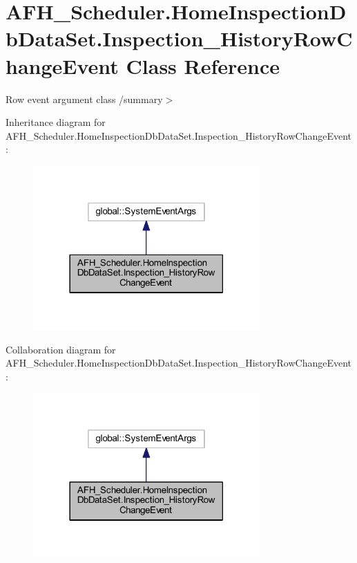 \section{A\+F\+H\+\_\+\+Scheduler.\+Home\+Inspection\+Db\+Data\+Set.\+Inspection\+\_\+\+History\+Row\+Change\+Event Class Reference}
\label{class_a_f_h___scheduler_1_1_home_inspection_db_data_set_1_1_inspection___history_row_change_event}


Row event argument class /summary$>$  




Inheritance diagram for A\+F\+H\+\_\+\+Scheduler.\+Home\+Inspection\+Db\+Data\+Set.\+Inspection\+\_\+\+History\+Row\+Change\+Event\+:
\nopagebreak
\begin{figure}[H]
\begin{center}
\leavevmode
\includegraphics[width=246pt]{class_a_f_h___scheduler_1_1_home_inspection_db_data_set_1_1_inspection___history_row_change_event__inherit__graph}
\end{center}
\end{figure}


Collaboration diagram for A\+F\+H\+\_\+\+Scheduler.\+Home\+Inspection\+Db\+Data\+Set.\+Inspection\+\_\+\+History\+Row\+Change\+Event\+:
\nopagebreak
\begin{figure}[H]
\begin{center}
\leavevmode
\includegraphics[width=246pt]{class_a_f_h___scheduler_1_1_home_inspection_db_data_set_1_1_inspection___history_row_change_event__coll__graph}
\end{center}
\end{figure}
